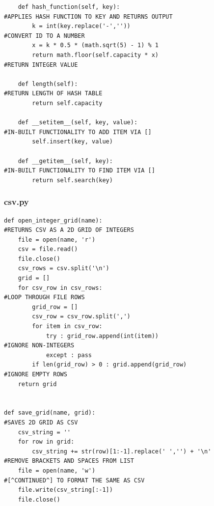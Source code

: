 \documentclass[titlepage]{article}
\begin{document}
\begin{changemargin}{-1in}{-1in}
\begin{verbatim}
    def hash_function(self, key):                                               #APPLIES HASH FUNCTION TO KEY AND RETURNS OUTPUT
        k = int(key.replace('-',''))                                            #CONVERT ID TO A NUMBER
        x = k * 0.5 * (math.sqrt(5) - 1) % 1
        return math.floor(self.capacity * x)                                    #RETURN INTEGER VALUE

    def length(self):                                                           #RETURN LENGTH OF HASH TABLE
        return self.capacity

    def __setitem__(self, key, value):                                          #IN-BUILT FUNCTIONALITY TO ADD ITEM VIA []
        self.insert(key, value)

    def __getitem__(self, key):                                                 #IN-BUILT FUNCTIONALITY TO FIND ITEM VIA []                                               
        return self.search(key)
\end{verbatim}
\end{changemargin} 


\pagebreak
\subsubsection{csv.py}
\begin{changemargin}{-1in}{-1in} 
\begin{verbatim}
def open_integer_grid(name):                                                    #RETURNS CSV AS A 2D GRID OF INTEGERS
    file = open(name, 'r')
    csv = file.read()
    file.close()
    csv_rows = csv.split('\n')
    grid = []
    for csv_row in csv_rows:                                                    #LOOP THROUGH FILE ROWS
        grid_row = []
        csv_row = csv_row.split(',')
        for item in csv_row:
            try : grid_row.append(int(item))                                    #IGNORE NON-INTEGERS
            except : pass
        if len(grid_row) > 0 : grid.append(grid_row)                            #IGNORE EMPTY ROWS
    return grid


def save_grid(name, grid):                                                      #SAVES 2D GRID AS CSV
    csv_string = ''
    for row in grid:
        csv_string += str(row)[1:-1].replace(' ','') + '\n'                     #REMOVE BRACKETS AND SPACES FROM LIST
    file = open(name, 'w')                                                      #[^CONTINUED^] TO FORMAT THE SAME AS CSV
    file.write(csv_string[:-1])
    file.close()
\end{verbatim}
\end{changemargin} 
\end{document}
